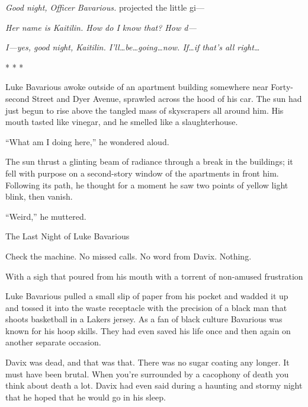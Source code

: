 {\em Good night, Officer Bavarious.} projected the little
gi---



{\em Her name is Kaitilin. How do I know that? How d---}



{\em I---yes, good night, Kaitilin. I'll{\ldots}be{\ldots}going{\ldots}now.
If{\ldots}if that's all right{\ldots}}



* * *



Luke Bavarious awoke outside of an apartment building somewhere
near Forty-second Street and Dyer Avenue, sprawled across the hood
of his car. The sun had just begun to rise above the tangled mass
of skyscrapers all around him. His mouth tasted like vinegar, and
he smelled like a slaughterhouse.



``What am I doing here,'' he wondered aloud.



The sun thrust a glinting beam of radiance through a break in the
buildings; it fell with purpose on a second-story window of the
apartments in front him. Following its path, he thought for a
moment he saw two points of yellow light blink, then vanish.



``Weird,'' he muttered. 
 





The Last Night of Luke Bavarious





Check the machine. No missed calls. No word from Davix.
Nothing.



With a sigh that poured from his mouth with a torrent of non-amused
frustration

Luke Bavarious pulled a small slip of paper from his pocket and
wadded it up and tossed it into the waste receptacle with the
precision of a black man that shoots basketball in a Lakers jersey.
As a fan of black culture Bavarious was known for his hoop skills.
They had even saved his life once and then again on another
separate occasion.



Davix was dead, and that was that. There was no sugar coating any
longer. It must have been brutal. When you're surrounded by a
cacophony of death you think about death a lot. Davix had even said
during a haunting and stormy night that he hoped that he would go
in his sleep.



